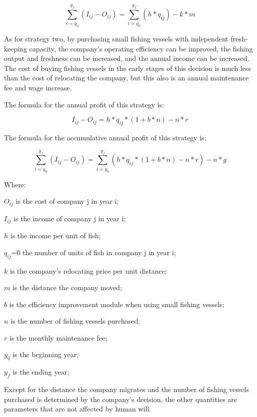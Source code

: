 \documentclass{mcmthesis}
\numberwithin{figure}{section}
\numberwithin{table}{section}
\begin{document}
\begin{equation}\label{2}
  \sum_{i=y_0}^{y_f} (I_{ij} - O_{ij}) = \sum_{i=y_0}^{y_f} (h * q_{ij}) - k*m
  \end{equation}
  
As for strategy two, by purchasing small fishing vessels with independent fresh-keeping capacity, the company's operating efficiency can be improved, the fishing output and freshness can be increased, and the annual income can be increased. The cost of buying fishing vessels in the early stages of this decision is much less than the cost of relocating the company, but this also is an annual maintenance fee and wage increase.

The formula for the annual profit of this strategy is:

\begin{equation}\label{3}
  I_{ij} - O_{ij} = h * q_{ij} * (1+b*n) - n*r
  \end{equation}

The formula for the accumulative annual profit of this strategy is:

\begin{equation}\label{4}
  \sum_{i=y_0}^{y_f} (I_{ij} - O_{ij}) = \sum_{i=y_0}^{y_f} (h * q_{ij}* (1+b*n) - n * r ) - n * g
\end{equation}
  

Where:

$O_{ij}$ is the cost of company j in year i;

$I_{ij}$ is the income of company j in year i;

$h$ is the income per unit of fish;

$q_{ij}$=0 the number of units of fish in company j in year i;

$k$ is the company's relocating price per unit distance;

$m$ is the distance the company moved;

$b$ is the efficiency improvement module when using small fishing vessels;

$n$ is the number of fishing vessels purchased;

$r$ is the monthly maintenance fee;

$y_0$ is the beginning year;

$y_f$ is the ending year;

Except for the distance the company migrates and the number of fishing vessels purchased is determined by the company's decision, the other quantities are parameters that are not affected by human will.
\end{document}
